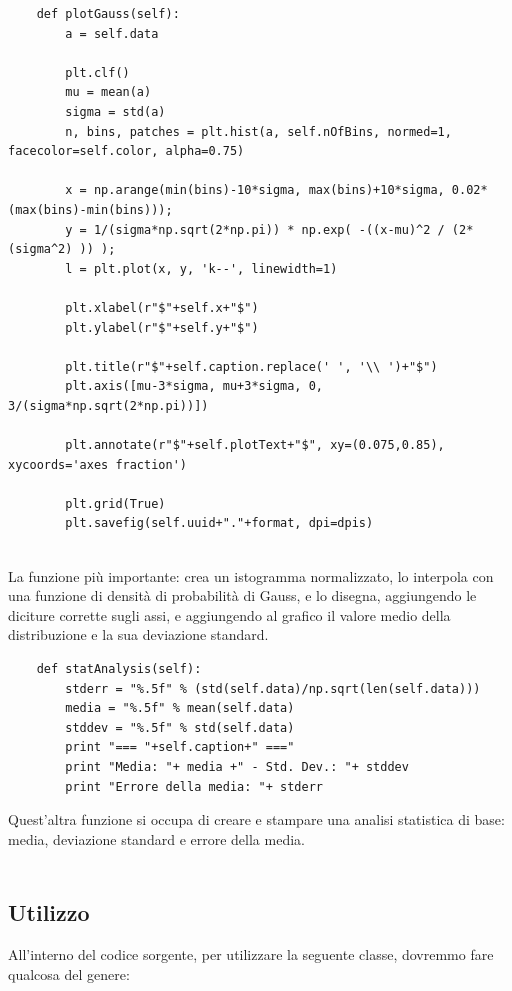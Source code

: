\begin{lstlisting}      
    def plotGauss(self):
        a = self.data
        
        plt.clf()
        mu = mean(a)
        sigma = std(a)
        n, bins, patches = plt.hist(a, self.nOfBins, normed=1, facecolor=self.color, alpha=0.75)
        
        x = np.arange(min(bins)-10*sigma, max(bins)+10*sigma, 0.02*(max(bins)-min(bins)));
        y = 1/(sigma*np.sqrt(2*np.pi)) * np.exp( -((x-mu)^2 / (2* (sigma^2) )) );
        l = plt.plot(x, y, 'k--', linewidth=1)
        
        plt.xlabel(r"$"+self.x+"$")
        plt.ylabel(r"$"+self.y+"$")
        
        plt.title(r"$"+self.caption.replace(' ', '\\ ')+"$")
        plt.axis([mu-3*sigma, mu+3*sigma, 0, 3/(sigma*np.sqrt(2*np.pi))])
        
        plt.annotate(r"$"+self.plotText+"$", xy=(0.075,0.85), xycoords='axes fraction')
        
        plt.grid(True)
        plt.savefig(self.uuid+"."+format, dpi=dpis)
        
\end{lstlisting}

La funzione più importante: crea un istogramma normalizzato, lo interpola con una funzione di densità di probabilità di Gauss, e lo disegna, aggiungendo le diciture corrette sugli assi, e aggiungendo al grafico il valore medio della distribuzione e la sua deviazione standard.

\begin{lstlisting}
    def statAnalysis(self):
        stderr = "%.5f" % (std(self.data)/np.sqrt(len(self.data)))
        media = "%.5f" % mean(self.data)
        stddev = "%.5f" % std(self.data)
        print "=== "+self.caption+" ==="
        print "Media: "+ media +" - Std. Dev.: "+ stddev
        print "Errore della media: "+ stderr
\end{lstlisting}

Quest'altra funzione si occupa di creare e stampare una analisi statistica di base: media, deviazione standard e errore della media.
\\
\\
\subsection{Utilizzo}
All'interno del codice sorgente, per utilizzare la seguente classe, dovremmo fare qualcosa del genere:

